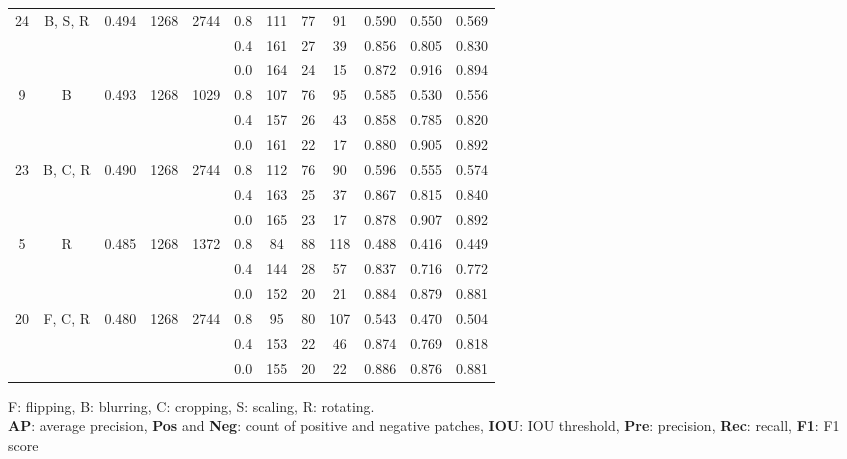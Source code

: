 \documentclass[preprint,12pt,authoryear]{elsarticle}
\begin{document}
\begin{table}[ht]
\begin{tabular}{c c c c  c ccc c c c c}
\multirow{3}{*}{24} &  \multirow{3}{*}{B, S, R} & \multirow{3}{*}{0.494 } & \multirow{3}{*}{1268} & \multirow{3}{*}{2744} &0.8 & 111 & 77 & 91 & 0.590  & 0.550  & 0.569 \\
 &  & &  &   & 0.4 & 161 & 27 & 39 & 0.856  & 0.805  & 0.830 \\
 &  & &  &   & 0.0 & 164 & 24 & 15 & 0.872  & 0.916  & 0.894 \\
\midrule
\multirow{3}{*}{9} &  \multirow{3}{*}{B} & \multirow{3}{*}{0.493 } & \multirow{3}{*}{1268} & \multirow{3}{*}{1029} &0.8 & 107 & 76 & 95 & 0.585  & 0.530  & 0.556 \\
 &  & &  &   & 0.4 & 157 & 26 & 43 & 0.858  & 0.785  & 0.820 \\
 &  & &  &   & 0.0 & 161 & 22 & 17 & 0.880  & 0.905  & 0.892 \\
\midrule
\multirow{3}{*}{23} &  \multirow{3}{*}{B, C, R} & \multirow{3}{*}{0.490 } & \multirow{3}{*}{1268} & \multirow{3}{*}{2744} &0.8 & 112 & 76 & 90 & 0.596  & 0.555  & 0.574 \\
 &  & &  &   & 0.4 & 163 & 25 & 37 & 0.867  & 0.815  & 0.840 \\
 &  & &  &   & 0.0 & 165 & 23 & 17 & 0.878  & 0.907  & 0.892 \\
\midrule
\multirow{3}{*}{5} &  \multirow{3}{*}{R} & \multirow{3}{*}{0.485 } & \multirow{3}{*}{1268} & \multirow{3}{*}{1372} &0.8 & 84 & 88 & 118 & 0.488  & 0.416  & 0.449 \\
 &  & &  &   & 0.4 & 144 & 28 & 57 & 0.837  & 0.716  & 0.772 \\
 &  & &  &   & 0.0 & 152 & 20 & 21 & 0.884  & 0.879  & 0.881 \\
\midrule
\multirow{3}{*}{20} &  \multirow{3}{*}{F, C, R} & \multirow{3}{*}{0.480 } & \multirow{3}{*}{1268} & \multirow{3}{*}{2744} &0.8 & 95 & 80 & 107 & 0.543  & 0.470  & 0.504 \\
 &  & &  &   & 0.4 & 153 & 22 & 46 & 0.874  & 0.769  & 0.818 \\
 &  & &  &   & 0.0 & 155 & 20 & 22 & 0.886  & 0.876  & 0.881 \\

\bottomrule
\end{tabular}
\raggedright F: flipping, B: blurring, C: cropping, S: scaling, R: rotating.  \\\textbf{AP}: average precision, \textbf{Pos} and \textbf{Neg}: count of positive and negative patches, \textbf{IOU}: IOU threshold, \textbf{Pre}: precision, \textbf{Rec}: recall, \textbf{F1}: F1 score

\end{table}
\end{document}
